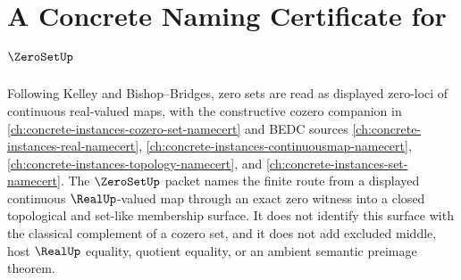 \chapter{A Concrete Naming Certificate for $\ZeroSetUp$}
\label{ch:concrete-instances-zero-set-namecert}

Following Kelley and Bishop--Bridges, zero sets are read as displayed zero-loci of continuous real-valued maps, with the constructive cozero companion in \autoref{ch:concrete-instances-cozero-set-namecert} and BEDC sources \autoref{ch:concrete-instances-real-namecert}, \autoref{ch:concrete-instances-continuousmap-namecert}, \autoref{ch:concrete-instances-topology-namecert}, and \autoref{ch:concrete-instances-set-namecert}. The $\ZeroSetUp$ packet names the finite route from a displayed continuous $\RealUp$-valued map through an exact zero witness into a closed topological and set-like membership surface. It does not identify this surface with the classical complement of a cozero set, and it does not add excluded middle, host $\RealUp$ equality, quotient equality, or an ambient semantic preimage theorem.

